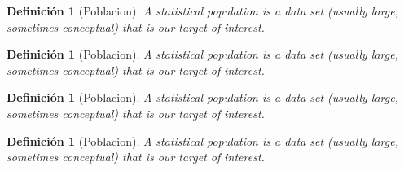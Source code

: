 \documentclass[a4paper]{report}
\newtheorem{defn}[thm]{Definición}
\begin{document}
\begin{defn}[Poblacion]
	A statistical population is a data set (usually large, sometimes conceptual) that is our target of interest.
\end{defn}
\begin{defn}[Poblacion]
	A statistical population is a data set (usually large, sometimes conceptual) that is our target of interest.
\end{defn}
\begin{defn}[Poblacion]
	A statistical population is a data set (usually large, sometimes conceptual) that is our target of interest.
\end{defn}
\begin{defn}[Poblacion]
	A statistical population is a data set (usually large, sometimes conceptual) that is our target of interest.
\end{defn}
\end{document}
